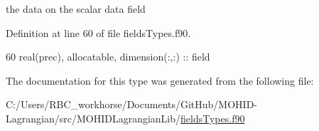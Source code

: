 the data on the scalar data field 



Definition at line 60 of file fields\+Types.\+f90.


\begin{DoxyCode}
60         \textcolor{keywordtype}{real(prec)}, \textcolor{keywordtype}{allocatable}, \textcolor{keywordtype}{dimension(:,:)} :: field
\end{DoxyCode}


The documentation for this type was generated from the following file\+:\begin{DoxyCompactItemize}
\item 
C\+:/\+Users/\+R\+B\+C\+\_\+workhorse/\+Documents/\+Git\+Hub/\+M\+O\+H\+I\+D-\/\+Lagrangian/src/\+M\+O\+H\+I\+D\+Lagrangian\+Lib/\mbox{\hyperlink{fields_types_8f90}{fields\+Types.\+f90}}\end{DoxyCompactItemize}
